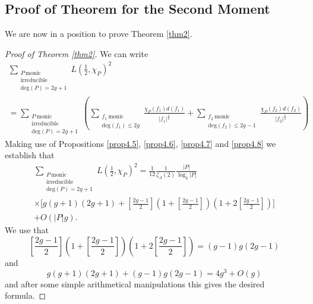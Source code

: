 \documentclass[11pt]{amsart}
\begin{document}
\subsection{Proof of Theorem for the Second Moment}
We are now in a position to prove Theorem \ref{thm2}.

\begin{proof}[Proof of Theorem \ref{thm2}]
We can write
\begin{multline}
\sum_{\substack{P \ \mathrm{monic} \\ \mathrm{irreducible} \\ \mathrm{deg}(P)=2g+1}}L(\tfrac{1}{2},\chi_{P})^{2}\nonumber\\
=\sum_{\substack{P \ \mathrm{monic} \\ \mathrm{irreducible} \\ \mathrm{deg}(P)=2g+1}}\left(\sum_{\substack{f_{1} \ \mathrm{monic} \\ \mathrm{deg}(f_{1})\leq2g}}\frac{\chi_{P}(f_{1})d(f_{1})}{|f_{1}|^{\tfrac{1}{2}}}+\sum_{\substack{f_{2} \ \mathrm{monic} \\ \mathrm{deg}(f_{2})\leq2g-1}}\frac{\chi_{P}(f_{2})d(f_{2})}{|f_{2}|^{\tfrac{1}{2}}}\right)
\end{multline} 
Making use of Propositions \ref{prop4.5}, \ref{prop4.6}, \ref{prop4.7} and \ref{prop4.8} we establish that
\begin{multline}
\sum_{\substack{P \ \mathrm{monic} \\ \mathrm{irreducible} \\ \mathrm{deg}(P)=2g+1}}L(\tfrac{1}{2},\chi_{P})^{2}=\frac{1}{12}\frac{1}{\zeta_{A}(2)}\frac{|P|}{\log_{q}|P|}\nonumber\\
\times\Bigg[g(g+1)(2g+1)+\left[\frac{2g-1}{2}\right]\left(1+\left[\frac{2g-1}{2}\right]\right)\left(1+2\left[\frac{2g-1}{2}\right]\right)\Bigg]\nonumber\\
+O\left(|P|g\right).\ \ \ \ \ \ \ \ \ \ \ \ \ \ \ \ \ \ \ \ \ \ \ \ \ \ \ \ \ \ \ \ \ \ \ \ \ \ \ \ \ \ \ \ \ \ \ \ \ \ \ \ \ \ \ \ \ \ \ \ \ \ \ \ \ \ \ \ \ \ \ \ \ \ \ 
\end{multline}
We use that
\begin{equation}
\left[\frac{2g-1}{2}\right]\left(1+\left[\frac{2g-1}{2}\right]\right)\left(1+2\left[\frac{2g-1}{2}\right]\right)=(g-1)g(2g-1)
\end{equation}
and
\begin{equation}
g(g+1)(2g+1)+(g-1)g(2g-1)=4g^{3}+O(g)
\end{equation}
and after some simple arithmetical manipulations this gives the desired formula.
\end{proof}
\end{document}
